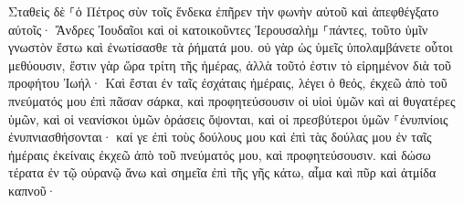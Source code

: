 \documentclass{openreader}
\begin{document}
Σταθεὶς δὲ ⸀ὁ Πέτρος σὺν τοῖς ἕνδεκα ἐπῆρεν τὴν φωνὴν αὐτοῦ καὶ ἀπεφθέγξατο αὐτοῖς· Ἄνδρες Ἰουδαῖοι καὶ οἱ κατοικοῦντες Ἰερουσαλὴμ ⸀πάντες, τοῦτο ὑμῖν γνωστὸν ἔστω καὶ ἐνωτίσασθε τὰ ῥήματά μου. 
οὐ γὰρ ὡς ὑμεῖς ὑπολαμβάνετε οὗτοι μεθύουσιν, ἔστιν γὰρ ὥρα τρίτη τῆς ἡμέρας, 
ἀλλὰ τοῦτό ἐστιν τὸ εἰρημένον διὰ τοῦ προφήτου Ἰωήλ· 
Καὶ ἔσται ἐν ταῖς ἐσχάταις ἡμέραις, λέγει ὁ θεός, ἐκχεῶ ἀπὸ τοῦ πνεύματός μου ἐπὶ πᾶσαν σάρκα, καὶ προφητεύσουσιν οἱ υἱοὶ ὑμῶν καὶ αἱ θυγατέρες ὑμῶν, καὶ οἱ νεανίσκοι ὑμῶν ὁράσεις ὄψονται, καὶ οἱ πρεσβύτεροι ὑμῶν ⸀ἐνυπνίοις ἐνυπνιασθήσονται· 
καί γε ἐπὶ τοὺς δούλους μου καὶ ἐπὶ τὰς δούλας μου ἐν ταῖς ἡμέραις ἐκείναις ἐκχεῶ ἀπὸ τοῦ πνεύματός μου, καὶ προφητεύσουσιν. 
καὶ δώσω τέρατα ἐν τῷ οὐρανῷ ἄνω καὶ σημεῖα ἐπὶ τῆς γῆς κάτω, αἷμα καὶ πῦρ καὶ ἀτμίδα καπνοῦ· 
\end{document}
